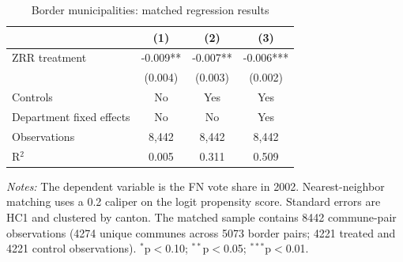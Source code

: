 \begin{table}[!htbp]
\centering
\footnotesize
\caption{Border municipalities: matched regression results}
\label{tab:border-results-matching}
\begin{tabular}{lccc}
\hline
 & (1) & (2) & (3) \\
\hline
ZRR treatment & -0.009** & -0.007** & -0.006*** \\
 & (0.004) & (0.003) & (0.002) \\
\hline
Controls & No & Yes & Yes \\
Department fixed effects & No & No & Yes \\
Observations & 8,442 & 8,442 & 8,442 \\
R$^2$ & 0.005 & 0.311 & 0.509 \\
\hline
\end{tabular}
\parbox{\textwidth}{\footnotesize \textit{Notes:} The dependent variable is the FN vote share in 2002. Nearest-neighbor matching uses a 0.2 caliper on the logit propensity score. Standard errors are HC1 and clustered by canton. The matched sample contains 8442 commune-pair observations (4274 unique communes across 5073 border pairs; 4221 treated and 4221 control observations). $^{*}$p$<$0.10; $^{**}$p$<$0.05; $^{***}$p$<$0.01.}
\end{table}
